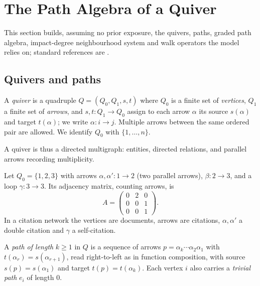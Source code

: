 \documentclass[runningheads]{llncs}
\newcommand{\Adj}{A}
\begin{document}
\section{The Path Algebra of a Quiver}\label{sec:algebra}

This section builds, assuming no prior exposure, the quivers, paths, graded
path algebra, impact-degree neighbourhood system and walk operators the model
relies on; standard references are \cite{schiffler2014quiver,assem2006elements}.

\subsection{Quivers and paths}

\begin{definition}
A \emph{quiver} is a quadruple $Q=(Q_0,Q_1,s,t)$ where $Q_0$ is a finite set of
\emph{vertices}, $Q_1$ a finite set of \emph{arrows}, and $s,t\colon Q_1\to
Q_0$ assign to each arrow $\alpha$ its source $s(\alpha)$ and target
$t(\alpha)$; we write $\alpha\colon i\to j$. Multiple arrows between the same
ordered pair are allowed. We identify $Q_0$ with $\{1,\dots,n\}$.
\end{definition}

A quiver is thus a directed multigraph: entities, directed relations, and
parallel arrows recording multiplicity.

\begin{example}\label{ex:firstquiver}
Let $Q_0=\{1,2,3\}$ with arrows $\alpha,\alpha'\colon 1\to 2$ (two parallel
arrows), $\beta\colon 2\to 3$, and a loop $\gamma\colon 3\to 3$. Its adjacency
matrix, counting arrows, is
\[
  \Adj=\begin{pmatrix}0&2&0\\0&0&1\\0&0&1\end{pmatrix}.
\]
In a citation network the vertices are documents, arrows are citations,
$\alpha,\alpha'$ a double citation and $\gamma$ a self-citation.
\end{example}

\begin{definition}
A \emph{path of length} $k\ge1$ in $Q$ is a sequence of arrows
$p=\alpha_k\cdots\alpha_2\alpha_1$ with $t(\alpha_r)=s(\alpha_{r+1})$, read
right-to-left as in function composition, with source $s(p)=s(\alpha_1)$ and
target $t(p)=t(\alpha_k)$. Each vertex $i$ also carries a \emph{trivial path}
$e_i$ of length $0$.
\end{definition}
\end{document}
